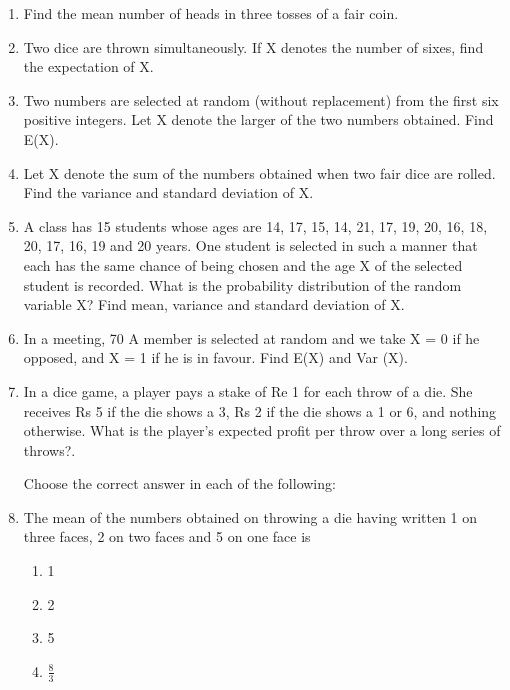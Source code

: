 \begin{enumerate}[label=\thechapter.\arabic*,ref=\thechapter.\theenumi]
\item 
Find the mean number of heads in three tosses of a fair coin.
\\
\solution


\item Two dice are thrown simultaneously. If X denotes the number of sixes, find the
expectation of X.

\item Two numbers are selected at random (without replacement) from the first six
positive integers. Let X denote the larger of the two numbers obtained. Find
E(X).

\item Let X denote the sum of the numbers obtained when two fair dice are rolled.
Find the variance and standard deviation of X.

\item A class has 15 students whose ages are 14, 17, 15, 14, 21, 17, 19, 20, 16, 18, 20,
17, 16, 19 and 20 years. One student is selected in such a manner that each has
the same chance of being chosen and the age X of the selected student is
recorded. What is the probability distribution of the random variable X? Find
mean, variance and standard deviation of X.

\item In a meeting, 70%
A member is selected at random and we take X = 0 if he opposed, and X = 1 if
he is in favour. Find E(X) and Var (X).\\

\item In a dice game, a player pays a stake of Re 1 for each throw of a die. She receives Rs 5 if the die shows a 3, Rs 2 if the die shows a 1 or 6, and nothing otherwise. What is the player’s expected profit per throw over a long series of throws?.\\
\solution


Choose the correct answer in each of the following:



\item The mean of the numbers obtained on throwing a die having written 1 on three
faces, 2 on two faces and 5 on one face is
\begin{enumerate}
\item 1
\item 2
\item 5
\item $\frac{8}{3}$


\end{enumerate}
\end{enumerate}

